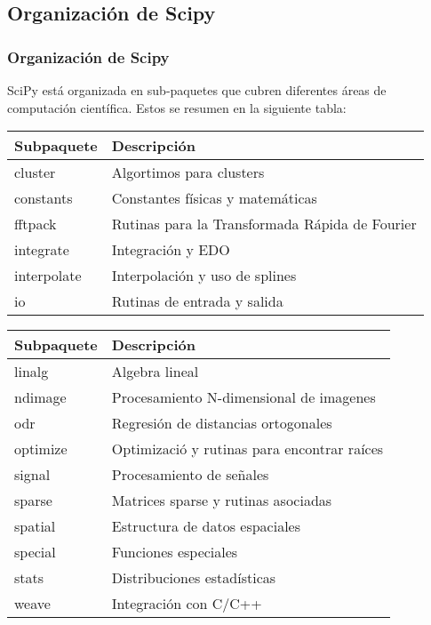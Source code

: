 \subsection{Organización de Scipy}
\begin{frame}
\frametitle{Organización de Scipy}
SciPy está organizada en sub-paquetes que cubren diferentes áreas de computación científica. Estos se resumen en la siguiente tabla:
\fontsize{12}{12}\selectfont
\begin{tabular}{l | l}
	Subpaquete	&	Descripción \\ \hline
	cluster		&	Algortimos para clusters \\ \hline
	constants	&	Constantes físicas y matemáticas \\ \hline
	fftpack 	&	Rutinas para la Transformada Rápida de Fourier \\ \hline
	integrate	&	Integración y EDO \\ \hline
	interpolate	&	Interpolación y uso de splines \\ \hline
	io			&	Rutinas de entrada y salida
\end{tabular}
\end{frame}
\begin{frame}
\fontsize{12}{12}\selectfont
\begin{tabular}{l | l}
	Subpaquete	&	Descripción \\ \hline
	linalg		&	Algebra lineal \\ \hline
	ndimage		&	Procesamiento N-dimensional de imagenes \\ \hline
	odr			&	Regresión de distancias ortogonales \\ \hline
	optimize	&	Optimizació y rutinas para encontrar raíces \\ \hline
	signal		&	Procesamiento de señales \\ \hline
	sparse		&	Matrices sparse y rutinas asociadas \\ \hline
	spatial		&	Estructura de datos espaciales \\ \hline
	special		&	Funciones especiales \\ \hline
	stats		&	Distribuciones estadísticas \\ \hline
	weave		&	Integración con C/C++
\end{tabular}
\end{frame}
